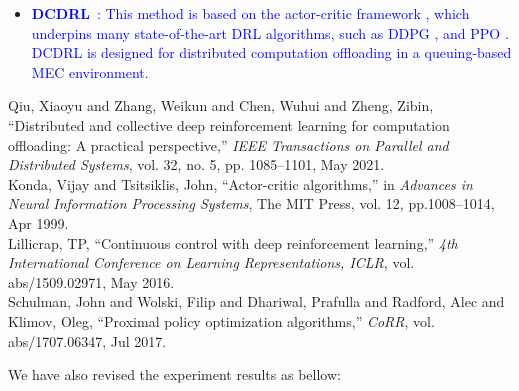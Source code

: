 \documentclass[12pt,draftclsnofoot,onecolumn]{IEEEtran}
\newcommand{\rev}[1]{{\color{blue}#1}} %
\newcommand{\rev}[1]{#1}
\newenvironment{my}[2]%
{\begin{list}{}%
{\setlength{\rightmargin}{#1}\setlength{\leftmargin}{#2}}%


 \item[]{}

} {\end{list}}
\begin{document}
\begin{enumerate}
\begin{my}{1cm}{1cm}
{{\begin{itemize}
				\color{blue}
			\item \textcolor{blue}{\textbf{DCDRL}~\cite{qiu2020distributed}: This method is based on the actor-critic framework \cite{NIPS1999_6449f44a}, which underpins many state-of-the-art DRL algorithms, such as DDPG \cite{lillicrap2015continuous}, and PPO \cite{schulman2017proximal}. DCDRL is designed for distributed computation offloading in a queuing-based MEC environment.} 
				
				
			\end{itemize}
			
	}}
\end{my}\vspace{5mm}

\begin{my}{1cm}{1cm}
	\rev{
		{\small
			\noindent\hspace{-0.5mm}\cite{qiu2020distributed} Qiu, Xiaoyu and Zhang, Weikun and Chen, Wuhui and Zheng, Zibin, ``Distributed and collective deep reinforcement learning for computation offloading: A practical perspective,'' \textit{IEEE Transactions on Parallel and Distributed Systems}, vol. 32, no. 5, pp. 1085--1101, May 2021.\\[10pt]
			\cite{NIPS1999_6449f44a} Konda, Vijay and Tsitsiklis, John, ``Actor-critic algorithms,'' in \textit{Advances in Neural Information Processing Systems}, The {MIT} Press, vol. 12, pp.1008--1014, Apr 1999.\\[10pt]
			\cite{lillicrap2015continuous} Lillicrap, TP, ``Continuous control with deep reinforcement learning,'' \textit{4th International Conference on Learning Representations, {ICLR}}, vol. abs/1509.02971, May 2016.\\[10pt]
			\cite{schulman2017proximal} Schulman, John and Wolski, Filip and Dhariwal, Prafulla and Radford, Alec and Klimov, Oleg, ``Proximal policy optimization algorithms,'' \textit{CoRR}, vol. abs/1707.06347, Jul 2017.}\\}
\end{my}
We have also revised the experiment results as bellow: 

\setcounter{figure}{2}


\end{enumerate}
\end{document}
